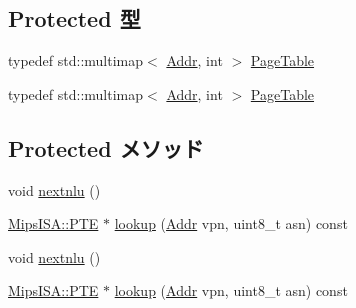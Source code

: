 \subsection*{Protected 型}
\begin{DoxyCompactItemize}
\item 
typedef std::multimap$<$ \hyperlink{classm5_1_1params_1_1Addr}{Addr}, int $>$ \hyperlink{classMipsISA_1_1TLB_a18f97eb978c56b976c0eadbf9212d206}{PageTable}
\item 
typedef std::multimap$<$ \hyperlink{classm5_1_1params_1_1Addr}{Addr}, int $>$ \hyperlink{classMipsISA_1_1TLB_a18f97eb978c56b976c0eadbf9212d206}{PageTable}
\end{DoxyCompactItemize}
\subsection*{Protected メソッド}
\begin{DoxyCompactItemize}
\item 
void \hyperlink{classMipsISA_1_1TLB_aeb5ba263cf2621ed26767046ab78a1dc}{nextnlu} ()
\item 
\hyperlink{structMipsISA_1_1PTE}{MipsISA::PTE} $\ast$ \hyperlink{classMipsISA_1_1TLB_a68714a0d5f62e6b1d8520c5feddc33fb}{lookup} (\hyperlink{classm5_1_1params_1_1Addr}{Addr} vpn, uint8\_\-t asn) const 
\item 
void \hyperlink{classMipsISA_1_1TLB_aeb5ba263cf2621ed26767046ab78a1dc}{nextnlu} ()
\item 
\hyperlink{structMipsISA_1_1PTE}{MipsISA::PTE} $\ast$ \hyperlink{classMipsISA_1_1TLB_acf8939ee59401397cfe789c6edbf9be2}{lookup} (\hyperlink{classm5_1_1params_1_1Addr}{Addr} vpn, uint8\_\-t asn) const 
\end{DoxyCompactItemize}
